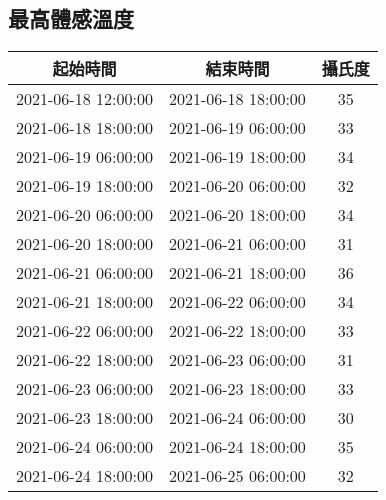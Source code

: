 \documentclass{article}%
\begin{document}
\begin{center}
\section{最高體感溫度}%
\label{sec:}%
\begin{tabular}{|c|c|c|}%
\hline%
起始時間&結束時間&攝氏度\\%
\hline%
2021{-}06{-}18 12:00:00&2021{-}06{-}18 18:00:00&35\\%
\hline%
2021{-}06{-}18 18:00:00&2021{-}06{-}19 06:00:00&33\\%
\hline%
2021{-}06{-}19 06:00:00&2021{-}06{-}19 18:00:00&34\\%
\hline%
2021{-}06{-}19 18:00:00&2021{-}06{-}20 06:00:00&32\\%
\hline%
2021{-}06{-}20 06:00:00&2021{-}06{-}20 18:00:00&34\\%
\hline%
2021{-}06{-}20 18:00:00&2021{-}06{-}21 06:00:00&31\\%
\hline%
2021{-}06{-}21 06:00:00&2021{-}06{-}21 18:00:00&36\\%
\hline%
2021{-}06{-}21 18:00:00&2021{-}06{-}22 06:00:00&34\\%
\hline%
2021{-}06{-}22 06:00:00&2021{-}06{-}22 18:00:00&33\\%
\hline%
2021{-}06{-}22 18:00:00&2021{-}06{-}23 06:00:00&31\\%
\hline%
2021{-}06{-}23 06:00:00&2021{-}06{-}23 18:00:00&33\\%
\hline%
2021{-}06{-}23 18:00:00&2021{-}06{-}24 06:00:00&30\\%
\hline%
2021{-}06{-}24 06:00:00&2021{-}06{-}24 18:00:00&35\\%
\hline%
2021{-}06{-}24 18:00:00&2021{-}06{-}25 06:00:00&32\\%
\hline%
\end{tabular}

%

\end{center}
\end{document}
